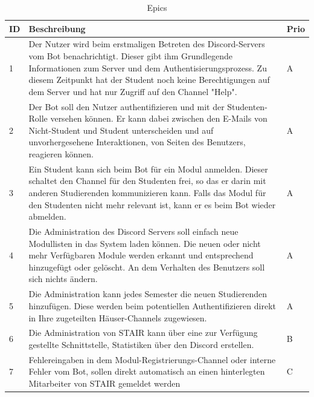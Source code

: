 \documentclass[a4paper, table]{article}
\begin{document}
\begin{table}[h]
    \centering
    \begin{tabular}{ | p{1em} | p{35em} | p{2em} |}
        \hline
        \rowcolor[gray]{.9} ID & Beschreibung & Prio \\
        \hline
        1 & Der Nutzer wird beim erstmaligen Betreten des Discord-Servers vom Bot benachrichtigt.
        Dieser gibt ihm Grundlegende Informationen zum Server und dem Authentisierungsprozess.
        Zu diesem Zeitpunkt hat der Student noch keine Berechtigungen auf dem Server und
        hat nur Zugriff auf den Channel "Help". & A \\
        \hline
        2 & Der Bot soll den Nutzer authentifizieren und mit der Studenten-Rolle versehen können.
        Er kann dabei zwischen den E-Mails von Nicht-Student und Student unterscheiden und auf unvorhergesehene
        Interaktionen, von Seiten des Benutzers, reagieren können. & A \\
        \hline
        3 & Ein Student kann sich beim Bot für ein Modul anmelden. Dieser schaltet den Channel für den Studenten frei,
        so das er darin mit anderen Studierenden kommunizieren kann. Falls das Modul für den Studenten nicht mehr relevant ist,
        kann er es beim Bot wieder abmelden. & A \\
        \hline
        4 & Die Administration des Discord Servers soll einfach neue Modullisten in das System laden können.
        Die neuen oder nicht mehr Verfügbaren Module werden erkannt und entsprechend hinzugefügt oder gelöscht.
        An dem Verhalten des Benutzers soll sich nichts ändern. & A \\
        \hline
        5 & Die Administration kann jedes Semester die neuen Studierenden hinzufügen.
        Diese werden beim potentiellen Authentifizieren direkt in Ihre zugeteilten Häuser-Channels zugewiesen. & A \\
        \hline
        6 & Die Administration von STAIR kann über eine zur Verfügung gestellte Schnittstelle, Statistiken über
        den Discord erstellen. & B \\
        \hline
        7 & Fehlereingaben in dem Modul-Registrierungs-Channel oder interne Fehler vom Bot, sollen direkt automatisch
        an einen hinterlegten Mitarbeiter von STAIR gemeldet werden & C \\
        \hline
    \end{tabular}
    \caption{Epics}
    \label{tab: Epics}
\end{table}
\end{document}
